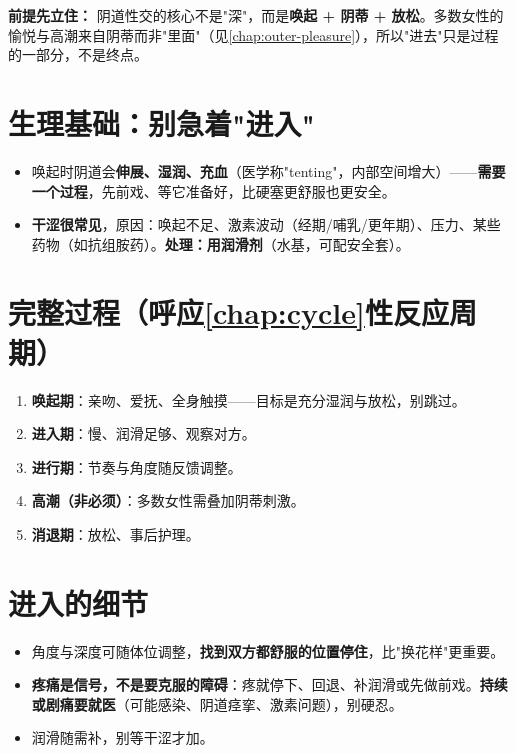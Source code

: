 \documentclass[12pt,UTF8,openany]{ctexbook}
\begin{document}
\noindent\textbf{前提先立住：} 阴道性交的核心不是"深"，而是\textbf{唤起 + 阴蒂 + 放松}。多数女性的愉悦与高潮来自阴蒂而非"里面"（见\ref{chap:outer-pleasure}），所以"进去"只是过程的一部分，不是终点。

\section{生理基础：别急着"进入"}

\begin{itemize}[leftmargin=2em,itemsep=0.3em]
  \item 唤起时阴道会\textbf{伸展、湿润、充血}（医学称"tenting"，内部空间增大）——\textbf{需要一个过程}，先前戏、等它准备好，比硬塞更舒服也更安全。
  \item \textbf{干涩很常见}，原因：唤起不足、激素波动（经期/哺乳/更年期）、压力、某些药物（如抗组胺药）。\textbf{处理：用润滑剂}（水基，可配安全套）。
\end{itemize}

\section{完整过程（呼应\ref{chap:cycle}性反应周期）}

\begin{enumerate}[leftmargin=2em,itemsep=0.3em]
  \item \textbf{唤起期}：亲吻、爱抚、全身触摸——目标是充分湿润与放松，别跳过。
  \item \textbf{进入期}：慢、润滑足够、观察对方。
  \item \textbf{进行期}：节奏与角度随反馈调整。
  \item \textbf{高潮（非必须）}：多数女性需叠加阴蒂刺激。
  \item \textbf{消退期}：放松、事后护理。
\end{enumerate}

\section{进入的细节}

\begin{itemize}[leftmargin=2em,itemsep=0.3em]
  \item 角度与深度可随体位调整，\textbf{找到双方都舒服的位置停住}，比"换花样"更重要。
  \item \textbf{疼痛是信号，不是要克服的障碍}：疼就停下、回退、补润滑或先做前戏。\textbf{持续或剧痛要就医}（可能感染、阴道痉挛、激素问题），别硬忍。
  \item 润滑随需补，别等干涩才加。
\end{itemize}
\end{document}
